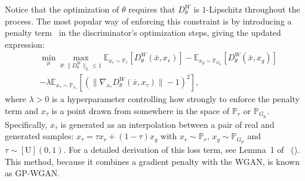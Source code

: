 \documentclass[letterpaper]{article} %
\newcommand{\namecite}[1]{\citeauthor{#1}~(\citeyear{#1})}
\begin{document}
Notice that the optimization of $\theta$ requires that $D^W_\theta$ is $1$-Lipschitz throughout the process. The most popular way of enforcing this constraint is by introducing a penalty term~\cite{gulrajani17} in the discriminator's optimization steps, giving the updated expression:
\begin{equation}
\begin{aligned}
&\min_{\mu} \max_{\theta : \|D^W_\theta\|_L \leq 1} \mathbb{E}_{x_r \sim \mathbb{P}_r} \left[ D^W_{\theta}(\bar{x}, x_r)\right] - \mathbb{E}_{x_g \sim \mathbb{P}_{G_\mu}} \left[ D^W_{\theta}(\bar{x}, x_g) \right] \\
&- \lambda \mathbb{E}_{x_\tau \sim \mathbb{P}_{x_\tau}} \left[ (\|\nabla_{x_\tau} D^W_\theta(\bar{x}, x_\tau) \| - 1)^2 \right],
\end{aligned}
\end{equation}
where $\lambda > 0$ is a hyperparameter controlling how strongly to enforce the penalty term and $x_\tau$ is a point drawn from somewhere in the space of $\mathbb{P}_r$ or $\mathbb{P}_{G_\mu}$. Specifically, $x_\tau$ is generated as an interpolation between a pair of real and generated samples: $x_\tau = \tau x_r + (1 - \tau) x_g$ with $x_r \sim \mathbb{P}_r$, $x_g \sim \mathbb{P}_{G_\mu}$ and $\tau \sim [\text{U}](0,1)$. For a detailed derivation of this loss term, see Lemma~1 of \namecite{gulrajani17}. This method, because it combines a gradient penalty with the WGAN, is known as GP-WGAN.
\end{document}

